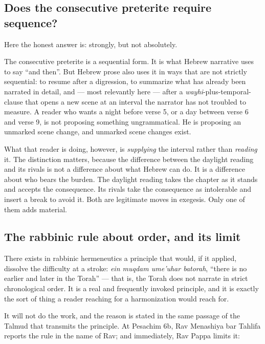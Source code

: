 \subsection{Does the consecutive preterite require sequence?}

Here the honest answer is: strongly, but not absolutely.

The consecutive preterite is a sequential form. It is what Hebrew narrative uses
to say ``and then''. But Hebrew prose also uses it in ways that are not strictly
sequential: to resume after a digression, to summarize what has already been
narrated in detail, and --- most relevantly here --- after a
\textit{wayhi}-plus-temporal-clause that opens a new scene at an interval the
narrator has not troubled to measure. A reader who wants a night before verse 5,
or a day between verse 6 and verse 9, is not proposing something ungrammatical.
He is proposing an unmarked scene change, and unmarked scene changes exist.

What that reader is doing, however, is \emph{supplying} the interval rather than
\emph{reading} it. The distinction matters, because the difference between the
daylight reading and its rivals is not a difference about what Hebrew can do. It
is a difference about who bears the burden. The daylight reading takes the
chapter as it stands and accepts the consequence. Its rivals take the
consequence as intolerable and insert a break to avoid it. Both are legitimate
moves in exegesis. Only one of them adds material.

\subsection{The rabbinic rule about order, and its limit}

There exists in rabbinic hermeneutics a principle that would, if it applied,
dissolve the difficulty at a stroke: \textit{ein muqdam ume'uhar batorah},
``there is no earlier and later in the Torah'' --- that is, the Torah does not
narrate in strict chronological order. It is a real and frequently invoked
principle, and it is exactly the sort of thing a reader reaching for a
harmonization would reach for.

It will not do the work, and the reason is stated in the same passage of the
Talmud that transmits the principle. At Pesachim 6b, Rav Menashiya bar Tahlifa
reports the rule in the name of Rav; and immediately, Rav Pappa limits it:

